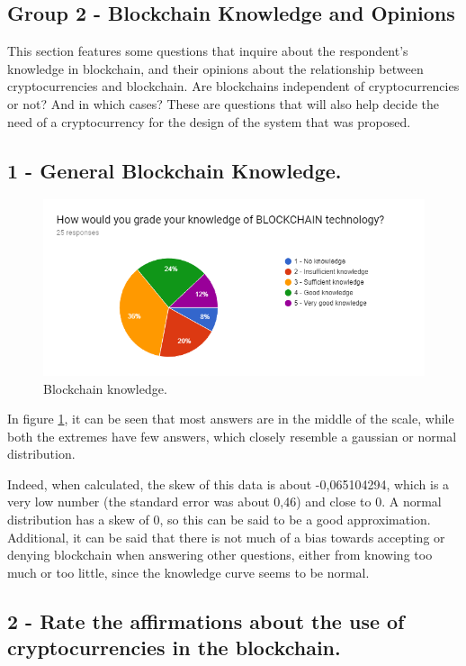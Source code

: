 
\subsection{Group 2 - Blockchain Knowledge and Opinions}

This section features some questions that inquire about the respondent's knowledge in blockchain, and their opinions about the relationship between cryptocurrencies and blockchain. Are blockchains independent of cryptocurrencies or not? And in which cases? These are questions that will also help decide the need of a cryptocurrency for the design of the system that was proposed.

\subsection*{1 - General Blockchain Knowledge.}
 \begin{figure}[h]
\centering
\includegraphics[scale=0.65]{media/blockchain_knowledge.png}
\caption["Blockchain knowledge."]{Blockchain knowledge.}
\label{fig:blockchain_knowledge}
\end{figure}

In figure \ref{fig:blockchain_knowledge}, it can be seen that most answers are in the middle of the scale, while both the extremes have few answers, which closely resemble a gaussian or normal distribution. 

Indeed, when calculated, the skew of this data is about -0,065104294, which is a very low number (the standard error was about 0,46) and close to 0. A normal distribution has a skew of 0, so this can be said to be a good approximation. Additional, it can be said that there is not much of a bias towards accepting or denying blockchain when answering other questions, either from knowing too much or too little, since the knowledge curve seems to be normal.
 
\subsection*{2 - Rate the affirmations about the use of cryptocurrencies in the blockchain.}

